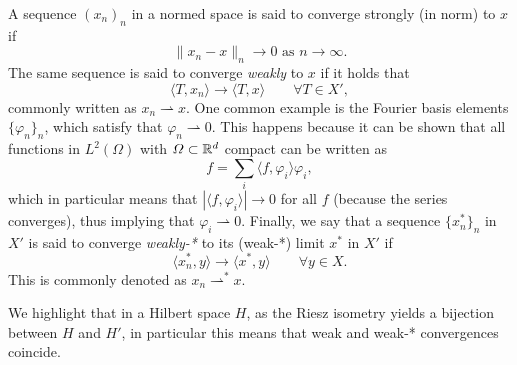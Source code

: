 \begin{definition} A sequence $(x_n)_n$ in a normed space is said to converge strongly (in norm) to $x$ if 
        $$ \| x_n - x \|_n \to 0 \text{ as } n \to \infty. $$
The same sequence is said to converge \emph{weakly} to $x$ if it holds that
        $$ \langle T, x_n\rangle \to \langle T, x\rangle \qquad \forall T \in X',$$
        commonly written as $x_n \rightharpoonup x$. One common example is the Fourier basis elements $\{\varphi_n\}_n$, which satisfy that $\varphi_n\rightharpoonup 0$. This happens because it can be shown that all functions in $L^2(\Omega)$ with $\Omega \subset \mathbb{R}^d$ compact can be written as
    $$ f = \sum_i \langle f, \varphi_i\rangle \varphi_i, $$
    which in particular means that $|\langle f, \varphi_i\rangle|\to 0$ for all $f$ (because the series converges), thus implying that $\varphi_i \rightharpoonup 0$. Finally, we say that a sequence $\{x_n^*\}_n$ in $X'$ is said to converge \emph{weakly-*} to its (weak-*) limit $x^*$ in $X'$ if
    $$ \langle x^*_n, y\rangle \to \langle x^*, y\rangle \qquad\forall y \in X. $$
This is commonly denoted as $x_n \rightharpoonup^* x$.
\end{definition}

We highlight that in a Hilbert space $H$, as the Riesz isometry yields a bijection between $H$ and $H'$, in particular this means that weak and weak-* convergences coincide. 

